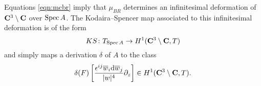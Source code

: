 \documentclass[../main.tex]{subfiles}
\begin{document}
Equations \eqref{eqn:mcbr} imply that $\mu_{BR}$ determines an infinitesimal deformation of~$\mathbf{C}^3 \setminus \mathbf{C}$ over $\operatorname{Spec} A$. 
The Kodaira--Spencer map associated to this infinitesimal deformation is of the form
\[
KS \colon T_{\operatorname{Spec} A} \to H^1(\mathbf{C}^3 \setminus \mathbf{C}, T) 
\]
and simply maps a derivation $\delta$ of $A$ to the class 
\[
\delta(F) \left[\frac{{\epsilon}^{ij} \overline w_i \mathrm{d} \overline w_j}{|w|^4} \partial_z \right] \in H^1(\mathbf{C}^3 \setminus \mathbf{C}, T) .
\] 
%
%
\end{document}
